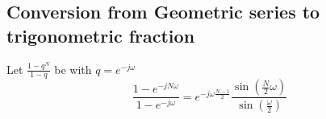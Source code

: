\documentclass[accentcolor=tud4c,9.5pt,nochapname,bigchapter,paper=a5report]{tudreport}
\begin{document}
\subsection{Conversion from Geometric series to trigonometric fraction} \label{geomconv}
Let $\frac{1-q^{N}}{1-q}$ be with $q = e^{-j\omega}$
\begin{equation}
\frac{1-e^{-jN\omega}}{1-e^{-j\omega}} = e^{-j\omega \frac{N-1}{2}}\frac{\sin\left(\frac{N}{2}\omega\right)}{\sin\left(\frac{\omega}{2}\right)}
\end{equation}
\end{document}
